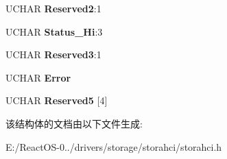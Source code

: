 \begin{DoxyCompactItemize}
\item 
\mbox{\label{struct___a_h_c_i___s_e_t___d_e_v_i_c_e___b_i_t_s___f_i_s_a6442422f78245ff702592afd513c65dc}} 
U\+C\+H\+AR {\bfseries Reserved2}\+:1
\item 
\mbox{\label{struct___a_h_c_i___s_e_t___d_e_v_i_c_e___b_i_t_s___f_i_s_a6cedd01f2d616d76f5d238227256106a}} 
U\+C\+H\+AR {\bfseries Status\+\_\+\+Hi}\+:3
\item 
\mbox{\label{struct___a_h_c_i___s_e_t___d_e_v_i_c_e___b_i_t_s___f_i_s_ae52afd74649e98e89f62b32237e27d6f}} 
U\+C\+H\+AR {\bfseries Reserved3}\+:1
\item 
\mbox{\label{struct___a_h_c_i___s_e_t___d_e_v_i_c_e___b_i_t_s___f_i_s_ace870073f3a713ffd28af349241b1f93}} 
U\+C\+H\+AR {\bfseries Error}
\item 
\mbox{\label{struct___a_h_c_i___s_e_t___d_e_v_i_c_e___b_i_t_s___f_i_s_a6754f6de21d9e43c760b74c6eca364f4}} 
U\+C\+H\+AR {\bfseries Reserved5} \mbox{[}4\mbox{]}
\end{DoxyCompactItemize}


该结构体的文档由以下文件生成\+:\begin{DoxyCompactItemize}
\item 
E\+:/\+React\+O\+S-\/0../drivers/storage/storahci/storahci.\+h\end{DoxyCompactItemize}
